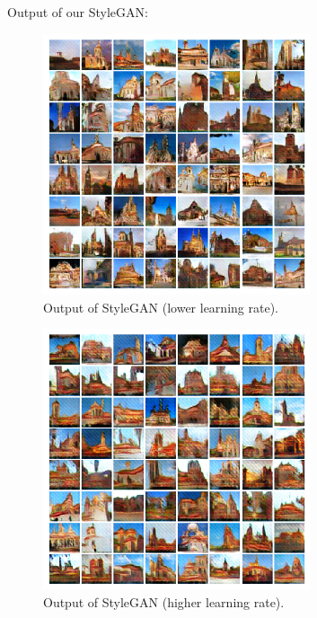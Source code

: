 \documentclass{article}
\begin{document}
\newpage
Output of our StyleGAN:

\begin{figure}[!h]
\centering
\includegraphics[width=0.7\textwidth]{../images/styleGAN_output.png}
\caption{Output of StyleGAN (lower learning rate).}
\label{f3}
\end{figure}

\begin{figure}[!h]
\centering
\includegraphics[width=0.7\textwidth]{../images/styleGAN_output2.png}
\caption{Output of StyleGAN (higher learning rate).}
\label{f4}
\end{figure}
\end{document}
